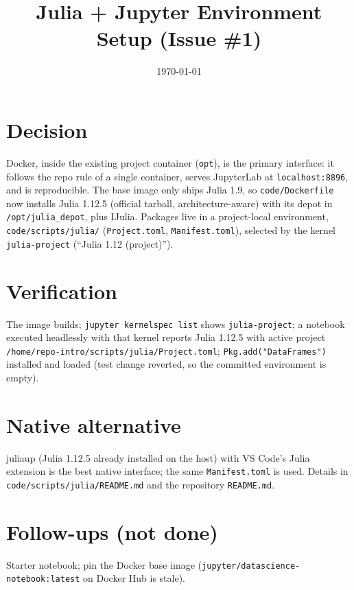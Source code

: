 \documentclass[11pt]{article}
\begin{document}
\title{Julia + Jupyter Environment Setup (Issue \#1)}
\date{\today}
\maketitle

\section*{Decision}
Docker, inside the existing project container (\texttt{opt}), is the primary interface: it follows the
repo rule of a single container, serves JupyterLab at \texttt{localhost:8896}, and is reproducible.
The base image only ships Julia 1.9, so \texttt{code/Dockerfile} now installs Julia 1.12.5 (official
tarball, architecture-aware) with its depot in \texttt{/opt/julia\_depot}, plus IJulia.
Packages live in a project-local environment, \texttt{code/scripts/julia/} (\texttt{Project.toml},
\texttt{Manifest.toml}), selected by the kernel \texttt{julia-project} (``Julia 1.12 (project)'').

\section*{Verification}
The image builds; \texttt{jupyter kernelspec list} shows \texttt{julia-project}; a notebook executed
headlessly with that kernel reports Julia 1.12.5 with active project
\texttt{/home/repo-intro/scripts/julia/Project.toml}; \texttt{Pkg.add("DataFrames")} installed and loaded
(test change reverted, so the committed environment is empty).

\section*{Native alternative}
juliaup (Julia 1.12.5 already installed on the host) with VS Code's Julia extension is the best native
interface; the same \texttt{Manifest.toml} is used. Details in \texttt{code/scripts/julia/README.md}
and the repository \texttt{README.md}.

\section*{Follow-ups (not done)}
Starter notebook; pin the Docker base image (\texttt{jupyter/datascience-notebook:latest} on Docker Hub is stale).
\end{document}
